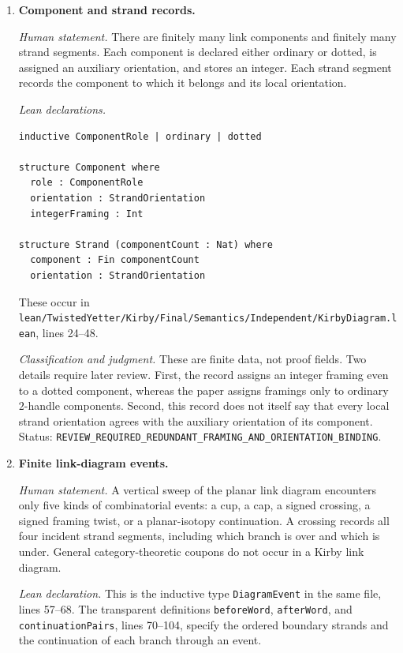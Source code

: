 \begin{enumerate}[label=\textbf{K\arabic*.},leftmargin=*]

\item \textbf{Component and strand records.}

\emph{Human statement.}
There are finitely many link components and finitely many strand segments.
Each component is declared either ordinary or dotted, is assigned an
auxiliary orientation, and stores an integer.  Each strand segment records
the component to which it belongs and its local orientation.

\emph{Lean declarations.}
\begin{verbatim}
inductive ComponentRole | ordinary | dotted

structure Component where
  role : ComponentRole
  orientation : StrandOrientation
  integerFraming : Int

structure Strand (componentCount : Nat) where
  component : Fin componentCount
  orientation : StrandOrientation
\end{verbatim}
These occur in
\nolinkurl{lean/TwistedYetter/Kirby/Final/Semantics/Independent/KirbyDiagram.lean},
lines 24--48.

\emph{Classification and judgment.}
These are finite data, not proof fields.  Two details require later review.
First, the record assigns an integer framing even to a dotted component,
whereas the paper assigns framings only to ordinary $2$-handle components.
Second, this record does not itself say that every local strand orientation
agrees with the auxiliary orientation of its component.  Status:
\nolinkurl{REVIEW_REQUIRED_REDUNDANT_FRAMING_AND_ORIENTATION_BINDING}.

\item \textbf{Finite link-diagram events.}

\emph{Human statement.}
A vertical sweep of the planar link diagram encounters only five kinds of
combinatorial events: a cup, a cap, a signed crossing, a signed framing twist,
or a planar-isotopy continuation.  A crossing records all four incident
strand segments, including which branch is over and which is under.  General
category-theoretic coupons do not occur in a Kirby link diagram.

\emph{Lean declaration.}
This is the inductive type \texttt{DiagramEvent} in the same file, lines
57--68.  The transparent definitions \texttt{beforeWord},
\texttt{afterWord}, and \texttt{continuationPairs}, lines 70--104, specify the
ordered boundary strands and the continuation of each branch through an
event.


\end{enumerate}

